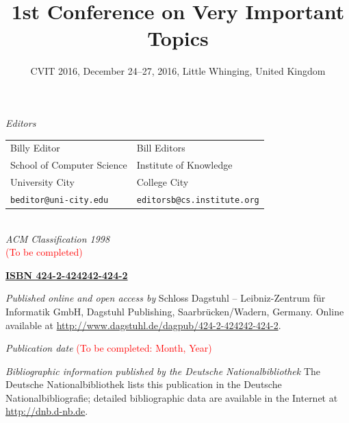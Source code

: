 \documentclass[a4paper,UKenglish]{lipicsmaster-v2016}
\title{\huge 1st Conference on Very Important Topics}
\subtitle{CVIT 2016, December 24--27, 2016, Little Whinging, United Kingdom}
\newcommand{\VolumeISBN}{424-2-424242-424-2}
\begin{document}
\frontmatter


\maketitle


\begin{publicationinfo}%
\sffamily

\emph{Editors} \\[0.2cm]
\begin{tabular}{ll}
Billy Editor              &   Bill Editors   \\
School of Computer Science   &  Institute of Knowledge \\ 
University City & College City \\ 
\texttt{beditor@uni-city.edu} &  \texttt{editorsb@cs.institute.org}
\end{tabular}
\ \\

\bigskip
\bigskip
\bigskip
\bigskip
\emph{ACM Classification 1998}\\
\textcolor{red}{(To be completed)}

\bigskip
\bigskip

{\Large\bf\sffamily \href{http://www.dagstuhl.de/dagpub/\VolumeISBN}{ISBN \VolumeISBN}}

\bigskip
\bigskip

\emph{Published online and open access by}\newline
Schloss Dagstuhl -- Leibniz-Zentrum f\"ur Informatik GmbH, Dagstuhl Publishing, Saarbr\"ucken/Wadern, Germany. Online available at \href{http://www.dagstuhl.de/dagpub/\VolumeISBN}{http://www.dagstuhl.de/dagpub/\VolumeISBN}.

\bigskip
\emph{Publication date}\newline
\textcolor{red}{(To be completed: Month, Year)}

\bigskip
\bigskip

\emph{Bibliographic information published by the Deutsche Nationalbibliothek}\newline
The Deutsche Nationalbibliothek lists this publication in the Deutsche Nationalbibliografie; detailed bibliographic data are available in the Internet at \href{http://dnb.d-nb.de}{http://dnb.d-nb.de}. 


\end{publicationinfo}
\end{document}
